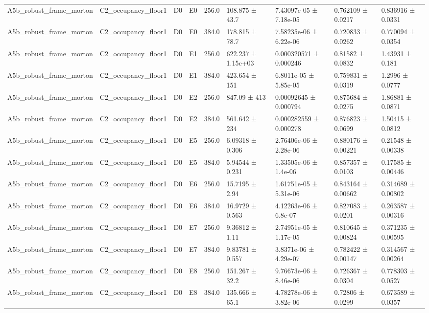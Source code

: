 \begin{table}
\begin{tabular}{lllllllll}
A5b\_robust\_frame\_morton & C2\_occupancy\_floor1 & D0 & E0 & 256.0 & 108.875 ± 43.7 & 7.43097e-05 ± 7.18e-05 & 0.762109 ± 0.0217 & 0.836916 ± 0.0331 \\
A5b\_robust\_frame\_morton & C2\_occupancy\_floor1 & D0 & E0 & 384.0 & 178.815 ± 78.7 & 7.58235e-06 ± 6.22e-06 & 0.720833 ± 0.0262 & 0.770094 ± 0.0354 \\
A5b\_robust\_frame\_morton & C2\_occupancy\_floor1 & D0 & E1 & 256.0 & 622.237 ± 1.15e+03 & 0.000320571 ± 0.000246 & 0.81582 ± 0.0832 & 1.43931 ± 0.181 \\
A5b\_robust\_frame\_morton & C2\_occupancy\_floor1 & D0 & E1 & 384.0 & 423.654 ± 151 & 6.8011e-05 ± 5.85e-05 & 0.759831 ± 0.0319 & 1.2996 ± 0.0777 \\
A5b\_robust\_frame\_morton & C2\_occupancy\_floor1 & D0 & E2 & 256.0 & 847.09 ± 413 & 0.00092645 ± 0.000794 & 0.875684 ± 0.0275 & 1.86881 ± 0.0871 \\
A5b\_robust\_frame\_morton & C2\_occupancy\_floor1 & D0 & E2 & 384.0 & 561.642 ± 234 & 0.000282559 ± 0.000278 & 0.876823 ± 0.0699 & 1.50415 ± 0.0812 \\
A5b\_robust\_frame\_morton & C2\_occupancy\_floor1 & D0 & E5 & 256.0 & 6.09318 ± 0.306 & 2.76406e-06 ± 2.28e-06 & 0.880176 ± 0.00221 & 0.21548 ± 0.00338 \\
A5b\_robust\_frame\_morton & C2\_occupancy\_floor1 & D0 & E5 & 384.0 & 5.94544 ± 0.231 & 1.33505e-06 ± 1.4e-06 & 0.857357 ± 0.0103 & 0.17585 ± 0.00446 \\
A5b\_robust\_frame\_morton & C2\_occupancy\_floor1 & D0 & E6 & 256.0 & 15.7195 ± 2.94 & 1.61751e-05 ± 5.31e-06 & 0.843164 ± 0.00662 & 0.314689 ± 0.00802 \\
A5b\_robust\_frame\_morton & C2\_occupancy\_floor1 & D0 & E6 & 384.0 & 16.9729 ± 0.563 & 4.12263e-06 ± 6.8e-07 & 0.827083 ± 0.0201 & 0.263587 ± 0.00316 \\
A5b\_robust\_frame\_morton & C2\_occupancy\_floor1 & D0 & E7 & 256.0 & 9.36812 ± 1.11 & 2.74951e-05 ± 1.17e-05 & 0.810645 ± 0.00824 & 0.371235 ± 0.00595 \\
A5b\_robust\_frame\_morton & C2\_occupancy\_floor1 & D0 & E7 & 384.0 & 9.83781 ± 0.557 & 3.8371e-06 ± 4.29e-07 & 0.782422 ± 0.00147 & 0.314567 ± 0.00264 \\
A5b\_robust\_frame\_morton & C2\_occupancy\_floor1 & D0 & E8 & 256.0 & 151.267 ± 32.2 & 9.76673e-06 ± 8.46e-06 & 0.726367 ± 0.0304 & 0.778303 ± 0.0527 \\
A5b\_robust\_frame\_morton & C2\_occupancy\_floor1 & D0 & E8 & 384.0 & 135.666 ± 65.1 & 4.78278e-06 ± 3.82e-06 & 0.72806 ± 0.0299 & 0.673589 ± 0.0357 \\

\end{tabular}
\end{table}
